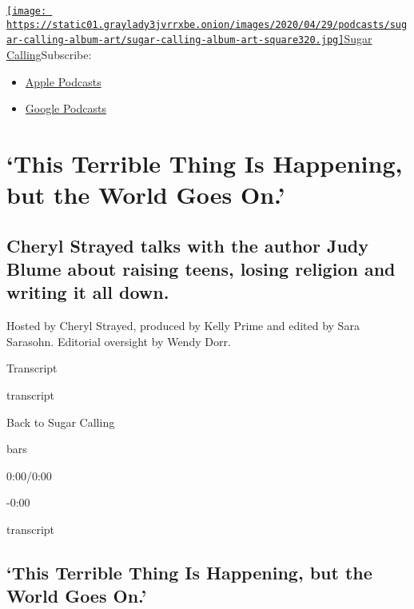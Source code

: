 \href{https://www.nytimes3xbfgragh.onion/column/sugar-calling}{\texttt{[image: https://static01.graylady3jvrrxbe.onion/images/2020/04/29/podcasts/sugar-calling-album-art/sugar-calling-album-art-square320.jpg]}Sugar
Calling}Subscribe:

\begin{itemize}
\tightlist
\item
  \href{https://itunes.apple.com/us/podcast/id1505881384}{Apple
  Podcasts}
\item
  \href{https://podcasts.google.com/?feed=aHR0cHM6Ly9yc3MuYXJ0MTkuY29tL3N1Z2FyLWNhbGxpbmc\&ved=0CAUQrrcFahcKEwjA8Kyn09voAhUAAAAAHQAAAAAQBQ}{Google
  Podcasts}
\end{itemize}

\hypertarget{this-terrible-thing-is-happening-but-the-world-goes-on-1}{%
\section{`This Terrible Thing Is Happening, but the World Goes
On.'}\label{this-terrible-thing-is-happening-but-the-world-goes-on-1}}

\hypertarget{cheryl-strayed-talks-with-the-author-judy-blume-about-raising-teens-losing-religion-and-writing-it-all-down-1}{%
\subsection{Cheryl Strayed talks with the author Judy Blume about
raising teens, losing religion and writing it all
down.}\label{cheryl-strayed-talks-with-the-author-judy-blume-about-raising-teens-losing-religion-and-writing-it-all-down-1}}

Hosted by Cheryl Strayed, produced by Kelly Prime and edited by Sara
Sarasohn. Editorial oversight by Wendy Dorr.

Transcript

transcript

Back to Sugar Calling

bars

0:00/0:00

-0:00

transcript

\hypertarget{this-terrible-thing-is-happening-but-the-world-goes-on-2}{%
\subsection{`This Terrible Thing Is Happening, but the World Goes
On.'}\label{this-terrible-thing-is-happening-but-the-world-goes-on-2}}

